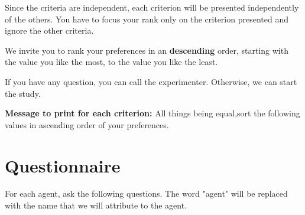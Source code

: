 \documentclass [french]{paper}
\begin{document}
			Since the criteria are independent, each criterion will be presented independently of the others. You have to focus your rank only on the criterion presented and ignore the other criteria.
			
			We invite you to rank your preferences in an \textbf {descending} order, starting with the value you like the most,  to the value you like the least.
			
			If you have any question, you can call the experimenter. Otherwise, we can start the study.
		
				 
				\textbf{Message to print for each criterion:}  All things being equal,sort the following values in ascending order of your preferences.
		
		
		\section{Questionnaire}
			For each agent, ask the following questions. The word "agent" will be replaced with the name that we will attribute to the agent.
\end{document}
